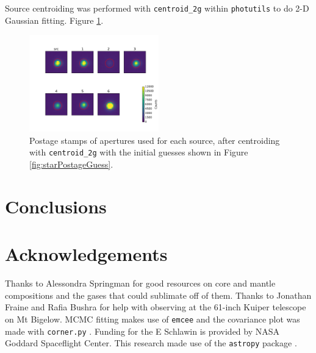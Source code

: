 \documentclass[twocolumn]{aastex61}
\begin{document}
Source centroiding was performed with \texttt{centroid\_2g} within \texttt{photutils} to do 2-D Gaussian fitting. Figure \ref{fig:starPostageCen}.

\begin{figure}
\begin{centering}
\includegraphics[width=0.5\textwidth]{images/postage_stamps_centered.pdf}
\caption{Postage stamps of apertures used for each source, after centroiding with \texttt{centroid\_2g} with the initial guesses shown in Figure \ref{fig:starPostageGuess}.}\label{fig:starPostageCen}
\end{centering}
\end{figure}

\clearpage

\section{Conclusions}\label{sec:conclusions}

\section{Acknowledgements}
Thanks to Alessondra Springman for good resources on core and mantle compositions and the gases that could sublimate off of them.
Thanks to Jonathan Fraine and Rafia Bushra for help with observing at the 61-inch Kuiper telescope on Mt Bigelow.
MCMC fitting makes use of \texttt{emcee} \citep{foreman-mackey2013emcee} and the covariance plot was made with \texttt{corner.py} \citep{foremanCorner}.
Funding for the E Schlawin is provided by NASA Goddard Spaceflight Center.
This research made use of the \texttt{astropy} package \citep{astropy2013}.

\end{document}
